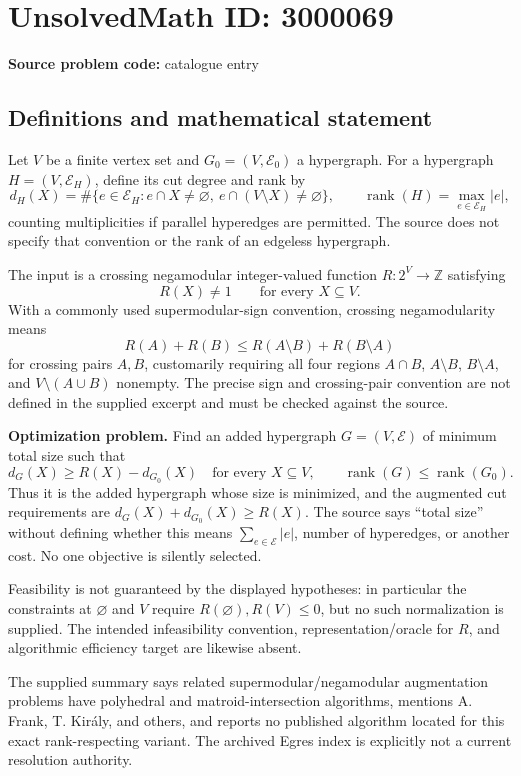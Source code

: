 \documentclass[11pt]{article}
\newcommand{\Z}{\mathbb{Z}}
\begin{document}
\section*{UnsolvedMath ID: 3000069}
\textbf{Source problem code:} catalogue entry
\subsection{Definitions and mathematical statement}
Let $V$ be a finite vertex set and $G_0=(V,\mathcal E_0)$ a hypergraph. For a hypergraph $H=(V,\mathcal E_H)$, define its cut degree and rank by
\[
 d_H(X)=\#\{e\in\mathcal E_H:e\cap X\ne\varnothing,
                              \ e\cap(V\setminus X)\ne\varnothing\},
 \qquad \operatorname{rank}(H)=\max_{e\in\mathcal E_H}|e|,
\]
counting multiplicities if parallel hyperedges are permitted. The source does not specify that convention or the rank of an edgeless hypergraph.

The input is a crossing negamodular integer-valued function $R:2^V\to\Z$ satisfying
\[
 R(X)\ne1\qquad\text{for every }X\subseteq V.
\]
With a commonly used supermodular-sign convention, crossing negamodularity means
\[
 R(A)+R(B)\leq R(A\setminus B)+R(B\setminus A)
\]
for crossing pairs $A,B$, customarily requiring all four regions $A\cap B$, $A\setminus B$, $B\setminus A$, and $V\setminus(A\cup B)$ nonempty. The precise sign and crossing-pair convention are not defined in the supplied excerpt and must be checked against the source.

\textbf{Optimization problem.} Find an added hypergraph $G=(V,\mathcal E)$ of minimum total size such that
\[
 d_G(X)\geq R(X)-d_{G_0}(X)\quad\text{for every }X\subseteq V,
 \qquad \operatorname{rank}(G)\leq\operatorname{rank}(G_0).
\]
Thus it is the added hypergraph whose size is minimized, and the augmented cut requirements are $d_G(X)+d_{G_0}(X)\geq R(X)$. The source says ``total size'' without defining whether this means $\sum_{e\in\mathcal E}|e|$, number of hyperedges, or another cost. No one objective is silently selected.

Feasibility is not guaranteed by the displayed hypotheses: in particular the constraints at $\varnothing$ and $V$ require $R(\varnothing),R(V)\leq0$, but no such normalization is supplied. The intended infeasibility convention, representation/oracle for $R$, and algorithmic efficiency target are likewise absent.

The supplied summary says related supermodular/negamodular augmentation problems have polyhedral and matroid-intersection algorithms, mentions A. Frank, T. Kir\'aly, and others, and reports no published algorithm located for this exact rank-respecting variant. The archived Egres index is explicitly not a current resolution authority.
\end{document}
